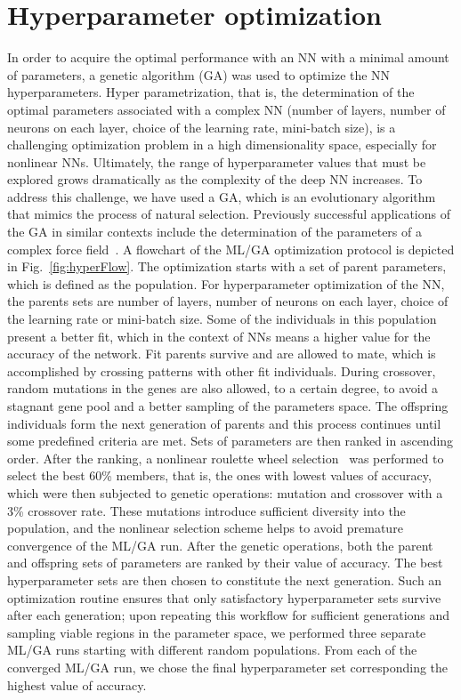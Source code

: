 \documentclass[showpacs,showkeys,preprint,prd,nofootinbib,linenumbers,12pt,superscriptaddress]{revtex4-1}
\begin{document}
\section{Hyperparameter optimization}
In order to acquire the optimal performance with an NN with a minimal amount of parameters, a genetic algorithm (GA) was used to optimize the NN hyperparameters. Hyper parametrization, that is, the determination of the optimal parameters associated with a complex NN (number of layers, number of neurons on each layer, choice of the learning rate, mini-batch size), is a challenging optimization problem in a high dimensionality space, especially for nonlinear NNs. Ultimately, the range of hyperparameter values that must be explored grows dramatically as the complexity of the deep NN increases. To address this challenge, we have used a GA, which is an evolutionary algorithm that mimics the process of natural selection. Previously successful applications of the GA in similar contexts include the determination of the parameters of a complex force field~\cite{doi:10.1021/acs.jctc.7b00521,doi:10.1021/acs.jctc.6b00432}. 
A flowchart of the ML/GA optimization protocol is depicted in Fig.~\ref{fig:hyperFlow}. The optimization starts with a set of parent parameters, which is defined as the population. For hyperparameter optimization of the NN, the parents sets are number of layers, number of neurons on each layer, choice of the learning rate or mini-batch size. Some of the individuals in this population present a better fit, which in the context of NNs means a higher value for the accuracy of the network. Fit parents survive and are allowed to mate, which is accomplished by crossing patterns with other fit individuals. During crossover, random mutations in the genes are also allowed, to a certain degree, to avoid a stagnant gene pool and a better sampling of the parameters space. The offspring individuals form the next generation of parents and this process continues until some predefined criteria are met. Sets of parameters are then ranked in ascending order. After the ranking, a nonlinear roulette wheel selection~\cite{DBLP:journals/corr/abs-1109-3627} was performed to select the best 60\% members, that is, the ones with lowest values of accuracy, which were then subjected to genetic operations: mutation and crossover with a 3\% crossover rate. These mutations introduce sufficient diversity into the population, and the nonlinear selection scheme helps to avoid premature convergence of the ML/GA run. After the genetic operations, both the parent and offspring sets of parameters are ranked by their value of accuracy. The best hyperparameter sets are then chosen to constitute the next generation. Such an optimization routine ensures that only satisfactory hyperparameter sets survive after each generation; upon repeating this workflow for sufficient generations and sampling viable regions in the parameter space, we performed three separate ML/GA runs starting with different random populations. From each of the converged ML/GA run, we chose the final hyperparameter set corresponding the highest value of accuracy. 
\end{document}
